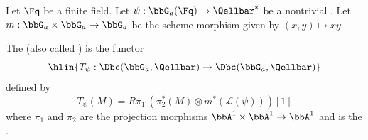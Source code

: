 \begin{definition} \label{definition:fourier_transform_functor_on_the_cohomologically_bounded_derived_category_of_ell_adic_sheaves_on_the_additive_group_over_a_finite_field_associated_to_a_character_on_the_additive_group_of_the_finite_field}
    Let $\Fq$ be a finite field. Let $\psi: \bbG_a(\Fq) \to \Qellbar^*$ be a nontrivial . Let $m: \bbG_a \times \bbG_a \to \bbG_a$ be the scheme morphism given by $(x,y) \mapsto xy$.

    The  (also called ) is the functor 
    $$\hlin{T_\psi: \Dbc(\bbG_a, \Qellbar) \to \Dbc(\bbG_a, \Qellbar)}$$
    defined by 
    $$T_\psi(M) = R\pi_{1!} \left( \pi_{2}^* (M) \otimes m^* (\mathscr{L}(\psi))\right)[1]$$
    where $\pi_1$ and $\pi_2$ are the projection morphisms $\bbA^1 \times \bbA^1 \to \bbA^1$ and  is the . %
\end{definition}